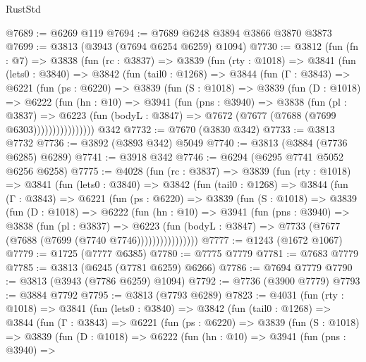 \begin{lexlean}{RustStd}
\begin{coremodule}
{\begin{coremodule}
{{{{{{{{{{{{{{{{{{{{{{{{{{{{{{{{{{{@7689 := @6269 @119
@7694 := @7689 @6248 @3894 @3866 @3870 @3873
@7699 := @3813 (@3943 (@7694 @6254 @6259) @1094)
@7730 := @3812
    (fun (fn : @7) =>
    @3838
      (fun (rc : @3837) =>
      @3839
        (fun (rty : @1018) =>
        @3841
          (fun (lets0 : @3840) =>
          @3842
            (fun (tail0 : @1268) =>
            @3844
              (fun (Γ : @3843) =>
              @6221
                (fun (ps : @6220) =>
                @3839
                  (fun (S : @1018) =>
                  @3839
                    (fun (D : @1018) =>
                    @6222
                      (fun (hn : @10) =>
                      @3941
                        (fun (pns : @3940) =>
                        @3838
                          (fun (pl : @3837) =>
                          @6223
                            (fun (bodyL : @3847) => @7672 (@7677 (@7688 (@7699 @6303))))))))))))))))
    @342
@7732 := @7670 (@3830 @342)
@7733 := @3813 @7732
@7736 := @3892 (@3893 @342) @5049
@7740 := @3813 (@3884 (@7736 @6285) @6289)
@7741 := @3918 @342
@7746 := @6294 (@6295 @7741 @5052 @6256 @6258)
@7775 := @4028
    (fun (rc : @3837) =>
    @3839
      (fun (rty : @1018) =>
      @3841
        (fun (lets0 : @3840) =>
        @3842
          (fun (tail0 : @1268) =>
          @3844
            (fun (Γ : @3843) =>
            @6221
              (fun (ps : @6220) =>
              @3839
                (fun (S : @1018) =>
                @3839
                  (fun (D : @1018) =>
                  @6222
                    (fun (hn : @10) =>
                    @3941
                      (fun (pns : @3940) =>
                      @3838
                        (fun (pl : @3837) =>
                        @6223
                          (fun (bodyL : @3847) =>
                          @7733 (@7677 (@7688 (@7699 (@7740 @7746))))))))))))))))
@7777 := @1243 (@1672 @1067)
@7779 := @1725 (@7777 @6385)
@7780 := @7775 @7779
@7781 := @7683 @7779
@7785 := @3813 (@6245 (@7781 @6259) @6266)
@7786 := @7694 @7779
@7790 := @3813 (@3943 (@7786 @6259) @1094)
@7792 := @7736 (@3900 @7779)
@7793 := @3884 @7792
@7795 := @3813 (@7793 @6289)
@7823 := @4031
    (fun (rty : @1018) =>
    @3841
      (fun (lets0 : @3840) =>
      @3842
        (fun (tail0 : @1268) =>
        @3844
          (fun (Γ : @3843) =>
          @6221
            (fun (ps : @6220) =>
            @3839
              (fun (S : @1018) =>
              @3839
                (fun (D : @1018) =>
                @6222
                  (fun (hn : @10) =>
                  @3941
                    (fun (pns : @3940) =>
}}}}}}}}}}}}}}}}}}}}}}}}}}}}}}}}}}}
\end{coremodule}}
\end{coremodule}
\end{lexlean}

